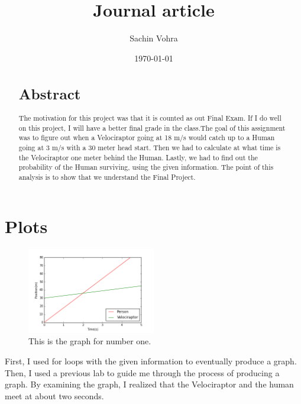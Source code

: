 \documentclass[twocolumn]{revtex4}
\begin{document}
\title{
Journal article
}

\author{Sachin Vohra}

\date{\today}

\begin{abstract}
\section{Abstract}
The motivation for this project was that it is counted as out Final Exam. If I do well on this 
    project, I will have a better final grade in the class.The goal of this assignment was to figure out 
    when a Velociraptor going at 18 m/s would catch up to a Human going at 3 m/s with a 30 meter head 
    start. Then we had to calculate at what time is the Velociraptor one meter behind the Human. Lastly,
    we had to find out the probability of the Human surviving, using the given information. The point of 
    this analysis is to show that we understand the Final Project. 
    
\end{abstract}

\maketitle

\section{Plots}
\begin{figure}[h]
	\centering 
	\includegraphics[width=0.5\textwidth] {PositionVsTime.png}
	\caption{This is the graph for number one.\label{figure:Graph}}
\end{figure}
First, I used for loops with the given information to eventually produce a graph.
Then, I used a previous lab to guide me through the process of producing a graph. By examining the 
graph, I realized that the Velociraptor and the human meet at about two seconds. 
\end{document}
